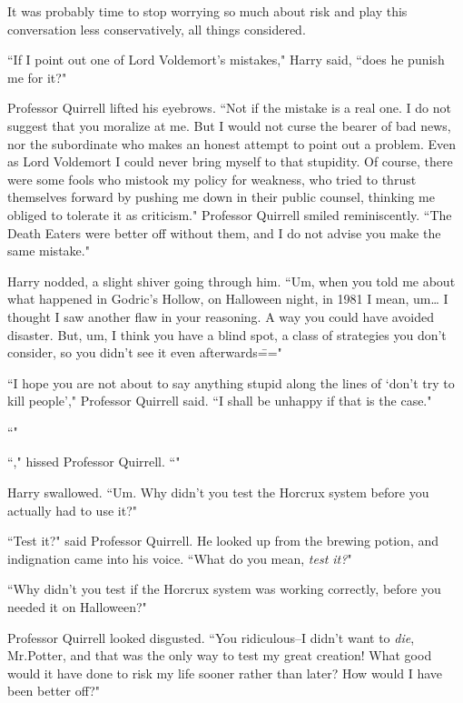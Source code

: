 It was probably time to stop worrying so much about risk and play this conversation less conservatively, all things considered.

``If I point out one of Lord Voldemort's mistakes," Harry said, ``does he punish me for it?"

Professor Quirrell lifted his eyebrows. ``Not if the mistake is a real one. I do not suggest that you moralize at me. But I would not curse the bearer of bad news, nor the subordinate who makes an honest attempt to point out a problem. Even as Lord Voldemort I could never bring myself to that stupidity. Of course, there were some fools who mistook my policy for weakness, who tried to thrust themselves forward by pushing me down in their public counsel, thinking me obliged to tolerate it as criticism." Professor Quirrell smiled reminiscently. ``The Death Eaters were better off without them, and I do not advise you make the same mistake."

Harry nodded, a slight shiver going through him. ``Um, when you told me about what happened in Godric's Hollow, on Halloween night, in 1981 I mean, um{\ldots} I thought I saw another flaw in your reasoning. A way you could have avoided disaster. But, um, I think you have a blind spot, a class of strategies you don't consider, so you didn't see it even afterwards\==="

``I hope you are not about to say anything stupid along the lines of `don't try to kill people'," Professor Quirrell said. ``I shall be unhappy if that is the case."

``"

``," hissed Professor Quirrell. ``"

Harry swallowed. ``Um. Why didn't you test the Horcrux system before you actually had to use it?"

``Test it?" said Professor Quirrell. He looked up from the brewing potion, and indignation came into his voice. ``What do you mean, \emph{test it?}"

``Why didn't you test if the Horcrux system was working correctly, before you needed it on Halloween?"

Professor Quirrell looked disgusted. ``You ridiculous\---I didn't want to \emph{die}, Mr.\?Potter, and that was the only way to test my great creation! What good would it have done to risk my life sooner rather than later? How would I have been better off?"

